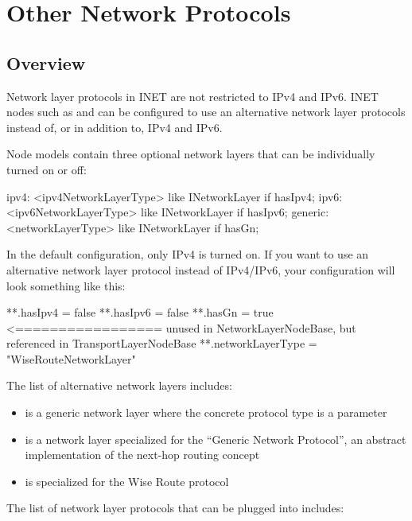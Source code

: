 \chapter{Other Network Protocols}
\label{cha:other-network-protocols}

\section{Overview}

Network layer protocols in INET are not restricted to IPv4 and IPv6. INET nodes such as
 and  can be configured to use an alternative
network layer protocols instead of, or in addition to, IPv4 and IPv6.

Node models contain three optional network layers that can be individually
turned on or off:

\begin{ned}
ipv4: <ipv4NetworkLayerType> like INetworkLayer if hasIpv4;
ipv6: <ipv6NetworkLayerType> like INetworkLayer if hasIpv6;
generic: <networkLayerType> like INetworkLayer if hasGn;
\end{ned}

In the default configuration, only IPv4 is turned on. If you want to use an
alternative network layer protocol instead of IPv4/IPv6, your configuration will
look something like this:

\begin{inifile}
**.hasIpv4 = false
**.hasIpv6 = false
**.hasGn = true  <================= unused in NetworkLayerNodeBase, but referenced in TransportLayerNodeBase
**.networkLayerType = "WiseRouteNetworkLayer"
\end{inifile}

The list of alternative network layers includes:

\begin{itemize}
  \item {} is a generic network layer where the
    concrete protocol type is a parameter
  \item {} is a network layer specialized 
    for the ``Generic Network Protocol'', an abstract implementation of the 
    next-hop routing concept
  \item {} is specialized for the Wise Route protocol
\end{itemize}

The list of network layer protocols that can be plugged into 
 includes:

